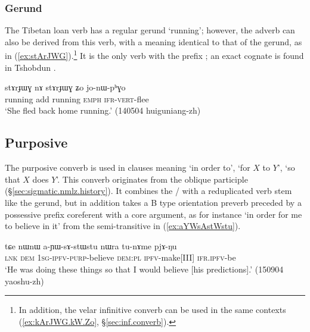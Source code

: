 \subsubsection{ Gerund} \label{sec:stArJWG}
The Tibetan loan verb  has a regular gerund  `running'; however, the adverb  can also be derived from this verb, with a meaning identical to that of the gerund, as in (\ref{ex:stArJWG}).\footnote{In addition, the velar infinitive converb  can be used in the same contexts (\ref{ex:kArJWG.kW.Zo}, §\ref{sec:inf.converb}). } It is the only verb with the prefix ; an exact cognate  is found in Tshobdun \citep[610]{jackson19tshobdun}.

\begin{exe}
\ex \label{ex:stArJWG}
\gll stɤrɟɯɣ nɤ stɤrɟɯɣ ʑo jo-nɯ-pʰɣo \\
running add running \textsc{emph} \textsc{ifr}-\textsc{vert}-flee \\
\glt `She fled back home running.' (140504 huiguniang-zh)
\end{exe}

 
\subsection{Purposive} \label{sec:purposive.converb}
The purposive converb is used in clauses meaning `in order to',  `for $X$ to $Y$', `so that $X$ does $Y$'. This converb originates from the oblique participle (§\ref{sec:sigmatic.nmlz.history}). It combines the / with a reduplicated verb stem like the gerund, but in addition takes a B type orientation preverb preceded by a possessive prefix coreferent with a core argument, as for instance  `in order for me to believe in it' from the semi-transitive  in (\ref{ex:aYWsAstWstu}). 

\begin{exe}
\ex \label{ex:aYWsAstWstu}
\gll  tɕe nɯnɯ a-ɲɯ-sɤ-stɯ\redp{}stu nɯra tu-nɤme pjɤ-ŋu \\
\textsc{lnk} \textsc{dem} \textsc{1sg}-\textsc{ipfv}-\textsc{purp}-believe \textsc{dem}:\textsc{pl} \textsc{ipfv}-make[III] \textsc{ifr}.\textsc{ipfv}-be \\
\glt `He was doing these things so that I would believe [his predictions].' (150904 yaoshu-zh) 
\end{exe}

